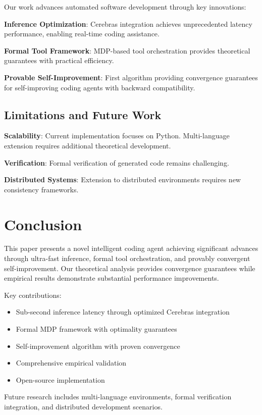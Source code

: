 \documentclass[10pt]{article}
\begin{document}
Our work advances automated software development through key innovations:

\textbf{Inference Optimization}: Cerebras integration achieves unprecedented latency performance, enabling real-time coding assistance.

\textbf{Formal Tool Framework}: MDP-based tool orchestration provides theoretical guarantees with practical efficiency.

\textbf{Provable Self-Improvement}: First algorithm providing convergence guarantees for self-improving coding agents with backward compatibility.

\subsection{Limitations and Future Work}

\textbf{Scalability}: Current implementation focuses on Python. Multi-language extension requires additional theoretical development.

\textbf{Verification}: Formal verification of generated code remains challenging.

\textbf{Distributed Systems}: Extension to distributed environments requires new consistency frameworks.

\section{Conclusion}

This paper presents a novel intelligent coding agent achieving significant advances through ultra-fast inference, formal tool orchestration, and provably convergent self-improvement. Our theoretical analysis provides convergence guarantees while empirical results demonstrate substantial performance improvements.

Key contributions:
\begin{itemize}
    \item Sub-second inference latency through optimized Cerebras integration
    \item Formal MDP framework with optimality guarantees  
    \item Self-improvement algorithm with proven convergence
    \item Comprehensive empirical validation
    \item Open-source implementation
\end{itemize}

Future research includes multi-language environments, formal verification integration, and distributed development scenarios.
\end{document}
